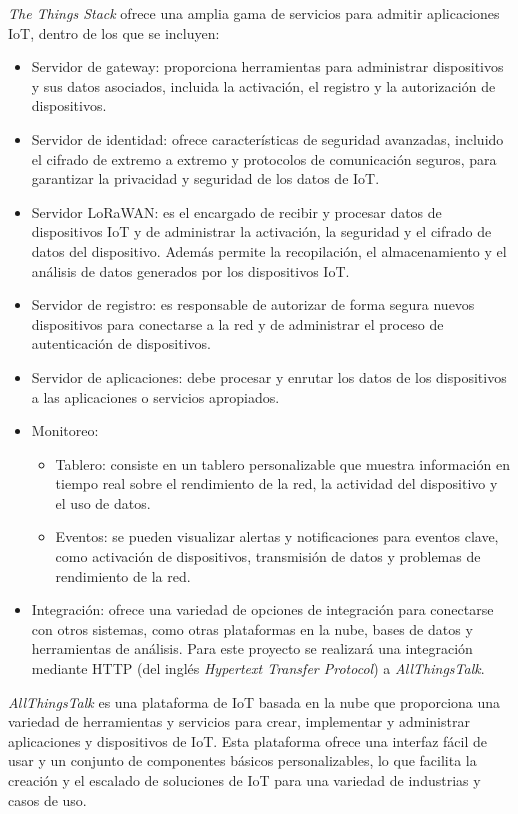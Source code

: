 \documentclass[
11pt, %
]{charter}
\begin{document}
\emph{The Things Stack} ofrece una amplia gama de servicios para admitir aplicaciones IoT, dentro de los que se incluyen: 
\begin{itemize}
	\item Servidor de gateway: proporciona herramientas para administrar dispositivos y sus datos asociados, incluida la activación, el registro y la autorización de dispositivos.
	\item Servidor de identidad: ofrece características de seguridad avanzadas, incluido el cifrado de extremo a extremo y protocolos de comunicación seguros, para garantizar la privacidad y seguridad de los datos de IoT.
	\item Servidor LoRaWAN: es el encargado de recibir y procesar datos de dispositivos IoT y de administrar la activación, la seguridad y el cifrado de datos del dispositivo. Además permite la recopilación, el almacenamiento y el análisis de datos generados por los dispositivos IoT.
	\item Servidor de registro: es responsable de autorizar de forma segura nuevos dispositivos para conectarse a la red y de administrar el proceso de autenticación de dispositivos.
	\item Servidor de aplicaciones: debe procesar y enrutar los datos de los dispositivos a las aplicaciones o servicios apropiados.
	\item Monitoreo:
		\begin{itemize}
		\item Tablero: consiste en un tablero personalizable que muestra información en tiempo real sobre el rendimiento de la red, la actividad del dispositivo y el uso de datos.
		\item Eventos: se pueden visualizar alertas y notificaciones para eventos clave, como activación de dispositivos, transmisión de datos y problemas de rendimiento de la red.
		\end{itemize}
	\item Integración: ofrece una variedad de opciones de integración para conectarse con otros sistemas, como otras plataformas en la nube, bases de datos y herramientas de análisis. Para este proyecto se realizará una integración mediante HTTP (del inglés \emph{Hypertext Transfer Protocol}) a \emph{AllThingsTalk}.
\end{itemize}

\emph{AllThingsTalk} es una plataforma de IoT basada en la nube que proporciona una variedad de herramientas y servicios para crear, implementar y administrar aplicaciones y dispositivos de IoT. Esta plataforma ofrece una interfaz fácil de usar y un conjunto de componentes básicos personalizables, lo que facilita la creación y el escalado de soluciones de IoT para una variedad de industrias y casos de uso. 
\end{document}
